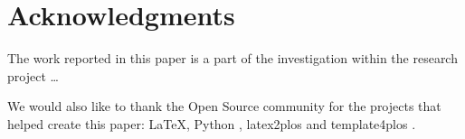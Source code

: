 \section*{Acknowledgments}

\finishsection

The work reported in this paper is a part of the investigation within the research project \ldots

We would also like to thank the Open Source community for the projects that helped create this paper: \LaTeX \cite{LaTeX}, Python \cite{Python}, latex2plos \cite{latex2plos} and template4plos \cite{template4plos}.
